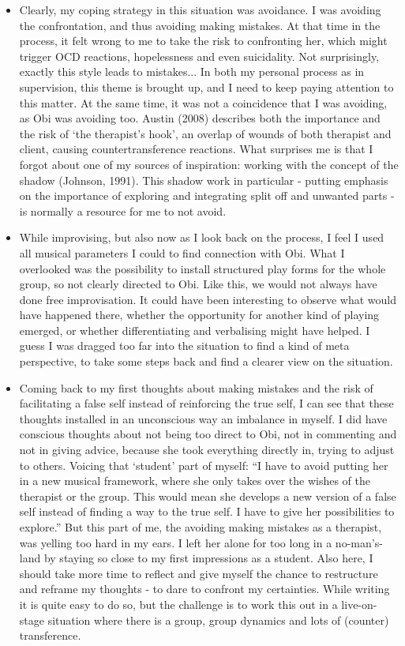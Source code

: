 \documentclass[authordate, empirical]{jote-new-article}
\begin{document}
\begin{itemize}
  \item Clearly, my coping strategy in this situation was avoidance. I was avoiding the confrontation, and thus avoiding making mistakes. At that time in the process, it felt wrong to me to take the risk to confronting her, which might trigger OCD reactions, hopelessness and even suicidality. Not surprisingly, exactly this style leads to mistakes... In both my personal process as in supervision, this theme is brought up, and I need to keep paying attention to this matter. At the same time, it was not a coincidence that I was avoiding, as Obi was avoiding too. Austin (2008) describes both the importance and the risk of ‘the therapist's hook', an overlap of wounds of both therapist and client, causing countertransference reactions. What surprises me is that I forgot about one of my sources of inspiration: working with the concept of the shadow (Johnson, 1991). This shadow work in particular - putting emphasis on the importance of exploring and integrating split off and unwanted parts - is normally a resource for me to not avoid.



  \item
        While improvising, but also now as I look back on the process, I feel I used all musical parameters I could to find connection with Obi. What I overlooked was the possibility to install structured play forms for the whole group, so not clearly directed to Obi. Like this, we would not always have done free improvisation. It could have been interesting to observe what would have happened there, whether the opportunity for another kind of playing emerged, or whether differentiating and verbalising might have helped. I guess I was dragged too far into the situation to find a kind of meta perspective, to take some steps back and find a clearer view on the situation.



  \item Coming back to my first thoughts about making mistakes and the risk of facilitating a false self instead of reinforcing the true self, I can see that these thoughts installed in an unconscious way an imbalance in myself. I did have conscious thoughts about not being too direct to Obi, not in commenting and not in giving advice, because she took everything directly in, trying to adjust to others. Voicing that ‘student' part of myself: “I have to avoid putting her in a new musical framework, where she only takes over the wishes of the therapist or the group. This would mean she develops a new version of a false self instead of finding a way to the true self. I have to give her possibilities to explore.” But this part of me, the avoiding making mistakes as a therapist, was yelling too hard in my ears. I left her alone for too long in a no-man's-land by staying so close to my first impressions as a student. Also here, I should take more time to reflect and give myself the chance to restructure and reframe my thoughts - to dare to confront my certainties. While writing it is quite easy to do so, but the challenge is to work this out in a live-on-stage situation where there is a group, group dynamics and lots of (counter) transference.



\end{itemize}
\end{document}
